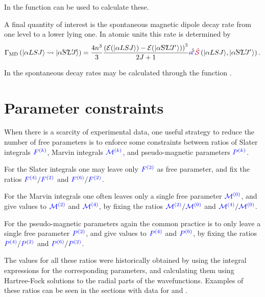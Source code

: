 \documentclass[11pt, twoside,openright]{article}
\begin{document}
In \qlanth the function  can be used to calculate these.

 


A final quantity of interest is the spontaneous magnetic dipole decay rate from one level to a lower lying one. In atomic units this rate is determined by 
\begin{equation}
	\decayRate{MD}{\alpha{LSJ}}{\alpha\mathrlap{'}
			S\mathrlap{'}
			L\mathrlap{'}
			J\mathrlap{'}} = \frac{4 n^3}{3} 
			\frac{
				\left(
					\mathcal{E}(
						\ket{\alpha{LSJ}}) - 
					\mathcal{E}(
						\ket{\alpha\mathrlap{'}
							S\mathrlap{'}
							L\mathrlap{'}
							J\mathrlap{'}\,\,})
				\right)^3
				}
				{2J+1} 
		\alphaFine^5
		\lineStrength\left(\ket{\alpha{LSJ}},\ket{\alpha\mathrlap{'} S\mathrlap{'} L\mathrlap{'} J\mathrlap{'}\,\,}\right).
\end{equation}

In \qlanth the spontaneous decay rates may be calculated through the function .

 

\section{Parameter constraints}\label{section:param-constraints}

When there is a scarcity of experimental data, one useful strategy to reduce the number of free parameters is to enforce some constraints between ratios of Slater integrals $\textcolor{blue}{{F^{(k)}}}$, Marvin integrals $\textcolor{blue}{\mathcal{M}^{(k)}}$, and pseudo-magnetic parameters $\textcolor{blue}{P^{(k)}}$.

 For the Slater integrals one may leave only $\textcolor{blue}{{F^{(2)}}}$ as free parameter, and fix the ratios $\textcolor{blue}{{F^{(4)}}}/\textcolor{blue}{{F^{(2)}}}$ and $\textcolor{blue}{{F^{(6)}}}/\textcolor{blue}{{F^{(2)}}}$.
 
 For the Marvin integrals one often leaves only a single free parameter $\textcolor{blue}{\mathcal{M}^{(0)}}$, and give values to $\textcolor{blue}{\mathcal{M}^{(2)}}$ and $\textcolor{blue}{\mathcal{M}^{(4)}}$, by fixing the ratios $\textcolor{blue}{\mathcal{M}^{(2)}}/\textcolor{blue}{\mathcal{M}^{(0)}}$ and $\textcolor{blue}{\mathcal{M}^{(4)}}/\textcolor{blue}{\mathcal{M}^{(0)}}$.
 
 For the pseudo-magnetic parameters again the common practice is to only leave a single free parameter $\textcolor{blue}{P^{(2)}}$, and give values to $\textcolor{blue}{P^{(4)}}$ and $\textcolor{blue}{P^{(6)}}$, by fixing the ratios $\textcolor{blue}{P^{(4)}}/\textcolor{blue}{P^{(2)}}$ and $\textcolor{blue}{P^{(6)}}/\textcolor{blue}{P^{(2)}}$.
 
 The values for all these ratios were historically obtained by using the integral expressions for the corresponding parameters, and calculating them using Hartree-Fock solutions to the radial parts of the wavefunctions. Examples of these ratios can be seen in the sections with data for \LaFthree and \liyorite.
\end{document}
